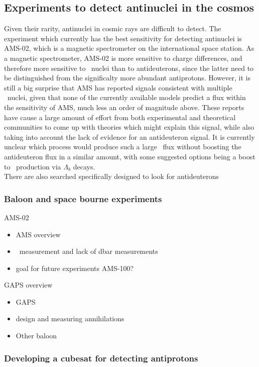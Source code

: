 \subsection{Experiments to detect antinuclei in the cosmos}
Given their rarity, antinuclei in cosmic rays are difficult to detect. The experiment which currently has the best sensitivity for detecting antinuclei is AMS-02, which is a magnetic spectrometer on the international space station. As a magnetic spectrometer, AMS-02 is more sensitive to charge differences, and therefore more sensitive to \ahe\ nuclei than to antideuterons, since the latter need to be distinguished from the significalty more abundant antiprotons. However, it is still a big surprise that AMS has reported signals consistent with multiple \ahe\ nuclei, given that none of the currently available models predict a flux within the sensitivity of AMS, much less an order of magnitude above. These reports have cause a large amount of effort from both experimental and theoretical communities to come up with theories which might explain this signal, while also taking into account the lack of evidence for an antideuteron signal. It is currently unclear which process would produce such a large \ahe\ flux without boosting the antideuteron flux in a similar amount, with some suggested options being a boost to \ahe\ production via $\Lambda_b$ decays\cite{}. \\

There are also searched specifically designed to look for antideuterons
\subsubsection{Baloon and space bourne experiments}
AMS-02
\begin{itemize}
    \item AMS overview
    \item \ahe\ measurement and lack of dbar measurements
    \item goal for future experiments AMS-100?
\end{itemize}
GAPS overview
\begin{itemize}
    \item GAPS
    \item design and measuring annihilations
    \item Other baloon 
\end{itemize}
\subsubsection{Developing a cubesat for detecting antiprotons}
